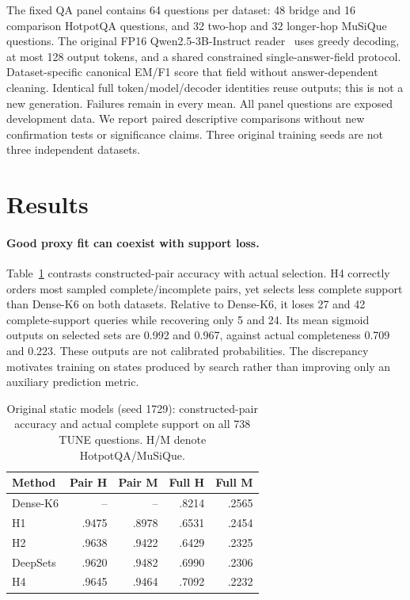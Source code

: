\documentclass[runningheads]{llncs}
\begin{document}
The fixed QA panel contains 64 questions per dataset: 48 bridge and 16
comparison HotpotQA questions, and 32 two-hop and 32 longer-hop MuSiQue
questions. The original FP16 Qwen2.5-3B-Instruct reader~\cite{qwen2024release} uses greedy decoding,
at most 128 output tokens, and a shared constrained single-answer-field
protocol. Dataset-specific canonical EM/F1 score that field without
answer-dependent cleaning. Identical full token/model/decoder identities
reuse outputs; this is not a new generation. Failures remain in every mean.
All panel questions are exposed development data. We report paired
descriptive comparisons without new confirmation tests or significance
claims. Three original training seeds are not three independent datasets.

\section{Results}
\paragraph{Good proxy fit can coexist with support loss.}
Table~\ref{tab:proxy} contrasts constructed-pair accuracy with actual
selection. H4 correctly orders most sampled complete/incomplete pairs, yet
selects less complete support than Dense-K6 on both datasets. Relative to
Dense-K6, it loses 27 and 42 complete-support queries while recovering only
5 and 24. Its mean sigmoid outputs on selected sets are 0.992 and 0.967,
against actual completeness 0.709 and 0.223. These outputs are not calibrated
probabilities. The discrepancy motivates training on states produced by
search rather than improving only an auxiliary prediction metric.

\begin{table}[t]
\caption{Original static models (seed 1729): constructed-pair accuracy and actual complete
support on all 738 TUNE questions. H/M denote HotpotQA/MuSiQue.}
\label{tab:proxy}\centering\small
\begin{tabular}{lrrrr}\toprule
Method & Pair H & Pair M & Full H & Full M\\\midrule
Dense-K6 & -- & -- & .8214 & .2565\\
H1 & .9475 & .8978 & .6531 & .2454\\
H2 & .9638 & .9422 & .6429 & .2325\\
DeepSets & .9620 & .9482 & .6990 & .2306\\
H4 & .9645 & .9464 & .7092 & .2232\\\bottomrule
\end{tabular}
\end{table}
\end{document}
